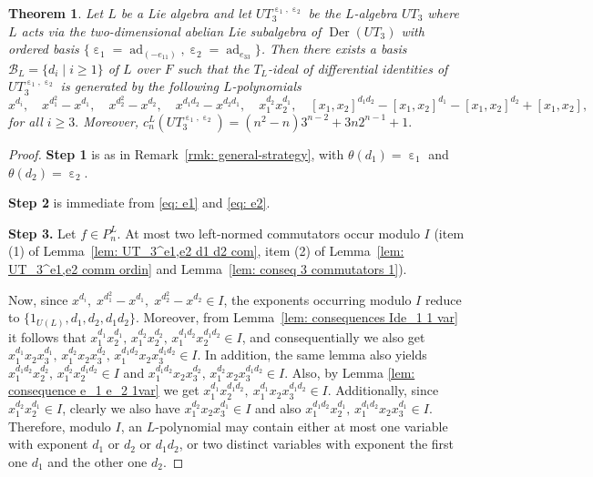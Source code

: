\documentclass[a4paper,reqno]{amsart}
\newtheorem{theorem}{Theorem}
\theoremstyle{definition}
\numberwithin{equation}{section}
\numberwithin{theorem}{section}
\DeclareMathOperator{\e}{\varepsilon}
\DeclareMathOperator{\ad}{ad}
\DeclareMathOperator{\D}{Der}
\begin{document}
\begin{theorem}\label{Teo: Id^L UT_3 epsilon1, epsilon2}
Let $L$ be a Lie algebra and  let $UT_3^{\e_1, \e_2}$  be the $L$-algebra $UT_3$ where $L$ acts via the two-dimensional abelian Lie subalgebra of $\D(UT_3)$ with ordered basis $\{\e_1=\ad_{(-e_{11})} , \e_2=\ad_{e_{33}} \}$. Then 
there exists a basis $\mathcal{B}_L=\{d_i \mid i \geq 1\}$ of $L$ over $F$ such that 
the $T_L$-ideal of differential identities of $UT_3^{\e_1, \e_2}$ is generated by the following $L$-polynomials
$$
x^{d_i}, \quad x^{d_1^2}-x^{d_1}, \quad x^{d_2^2}-x^{d_2}, \quad x^{d_1d_2}-x^{d_2d_1},  \quad x_1^{d_2}x_2^{d_1}, \quad   [x_1,x_2]^{d_1 d_2}-[x_1,x_2]^{d_1} -[x_1,x_2]^{d_2} + [x_1,x_2],$$
for all $i\geq 3.$ Moreover, $c_n^L(UT_3^{\e_1,\e_2})= (n^2-n)3^{n-2}+3n2^{n-1}+1.$
\end{theorem}
\begin{proof}
\textbf{Step 1} is as in Remark~\ref{rmk: general-strategy}, with $\theta(d_1)=\e_1$ and
$\theta(d_2)=\e_2$.

\textbf{Step 2} is immediate from \eqref{eq: e1} and \eqref{eq: e2}.

\textbf{Step 3.} Let $f\in P_n^L$. At most two left-normed commutators occur modulo $I$ (item (1)
of Lemma~\ref{lem: UT_3^e1,e2 d1 d2 com}, item (2) of Lemma~\ref{lem: UT_3^e1,e2 comm ordin} and
Lemma~\ref{lem: conseq 3 commutators 1}). 


     Now, since $x^{d_i}, \; x^{d_1^2}-x^{d_1}, \; x^{d_2^2}-x^{d_2}\in I$, the exponents occurring modulo $I$ reduce to  $\{1_{U(L)}, d_1, d_2, d_1d_2\}.$ 
     Moreover, from  Lemma~\ref{lem: consequences Ide_1 1 var} it follows that $x_1^{d_1}x_2^{d_1},\, x_1^{d_2}x_2^{d_2},\,   x_1^{d_1 d_2} x_2^{d_1 d_2} \in I$,  and consequentially we also get $ x_1^{d_1}x_2 x_3^{d_1}, \, x_1^{d_2}x_2 x_3^{d_2}, \, x_1^{d_1 d_2} x_2x_3^{d_1 d_2}\in I$.
     In addition, the same lemma also yields $x_1^{d_1 d_2} x_2^{d_2}, \, x_1^{d_2} x_2^{d_1 d_2}\in I$ and $ x_1^{d_1 d_2} x_2x_3^{d_2}, \, x_1^{d_2} x_2x_3^{d_1 d_2}\in I.$ Also, by Lemma \ref{lem: consequence e_1 e_2 1var} we get $x_1^{d_1} x_2^{d_1 d_2}, \ x_1^{d_1} x_2 x_3^{d_1 d_2} \in I.$
     Additionally, since $x_1^{d_2} x_2^{d_1}\in I$, clearly we also have $x_1^{d_2} x_2 x_3^{d_1}\in I$ and also $x_1^{d_1d_2}x_2^{d_1}, \,x_1^{d_1d_2}x_2x_3^{d_1}\in I.$ Therefore, modulo $I$, an $L$-polynomial may contain either at most one variable with exponent $d_1$ or $d_2$ or $d_1d_2$, or two distinct variables with exponent the first one $d_1$ and the other one $d_2$.


\end{proof}
\end{document}
